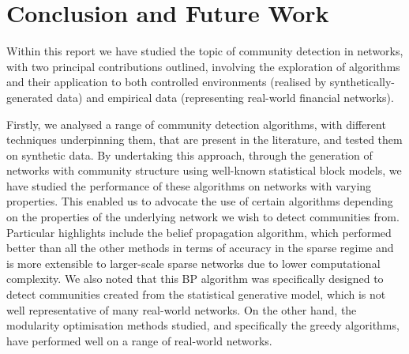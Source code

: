 
\chapter{Conclusion and Future Work}

\label{cha:Conclusion}


Within this report we have studied the topic of community detection in networks, with two principal contributions outlined, involving the exploration of algorithms and their application to both controlled environments (realised by synthetically-generated data) and empirical data (representing real-world financial networks).

Firstly, we analysed a range of community detection algorithms, with different techniques underpinning them, that are present in the literature, and tested them on synthetic data.
By undertaking this approach, through the generation of networks with community structure using well-known statistical block models, we have studied the performance of these algorithms on networks with varying properties.
This enabled us to advocate the use of certain algorithms depending on the properties of the underlying network we wish to detect communities from.
Particular highlights include the belief propagation algorithm, which performed better than all the other methods in terms of accuracy in the sparse regime and is more extensible to larger-scale sparse networks due to lower computational complexity.
We also noted that this BP algorithm was specifically designed to detect communities created from the statistical generative model, which is not well representative of many real-world networks.
On the other hand, the modularity optimisation methods studied, and specifically the greedy algorithms, have performed well on a range of real-world networks.

